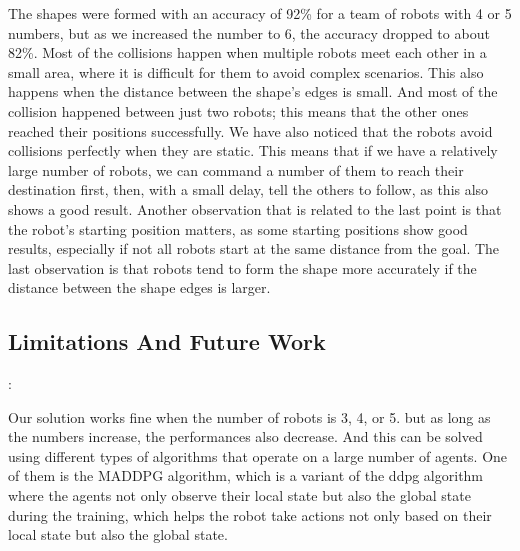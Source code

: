 \documentclass[12pt]{extarticle}
\begin{document}
The shapes were formed with an accuracy of 92\% for a team of robots with 4 or 5 numbers, but as we increased the number to 6, the accuracy dropped to about 82\%.
Most of the collisions happen when multiple robots meet each other in a small area, where it is difficult for them to avoid complex scenarios. This also happens when the distance between the shape's edges is small.
And most of the collision happened between just two robots; this means that the other ones reached their positions successfully. We have also noticed that the robots avoid collisions perfectly when they are static. This means that if we have a relatively large number of robots, we can command a number of them to reach their destination first, then, with a small delay, tell the others to follow, as this also shows a good result.
Another observation that is related to the last point is that the robot's starting position matters, as some starting positions show good results, especially if not all robots start at the same distance from the goal. \newpage The last observation is that robots tend to form the shape more accurately if the distance between the shape edges is larger.
 

\subsection{Limitations And Future Work}:

Our solution works fine when the number of robots is 3, 4, or 5. but as long as the numbers increase, the performances also decrease. And this can be solved using different types of algorithms that operate on a large number of agents. One of them is the MADDPG algorithm, which is a variant of the ddpg algorithm where the agents not only observe their local state but also the global state during the training, which helps the robot take actions not only based on their local state but also the global state.
\end{document}
